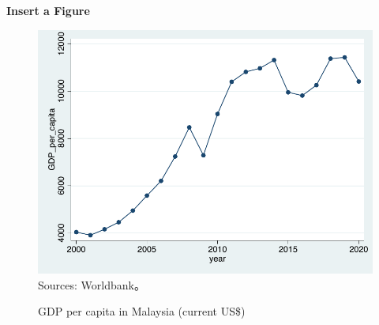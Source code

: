 \documentclass[12pt, aspectratio=169]{beamer}
\begin{document}
\linespread{1} 
\begin{frame}{\textbf{Insert a Figure}}
\linespread{1.5} 
	
	\begin{figure}
		\centering %
		\includegraphics[scale=0.45]{Fig/GDP_per_capita.pdf}\\ %
		\hspace{-9em}\scriptsize{Sources: Worldbank。}\\ %
		\vspace{-0.5em} %
		\caption{GDP per capita in Malaysia (current US\$)} %
		\label{GDP_per_capita} %
	\end{figure}
	
\end{frame}

\end{document}
